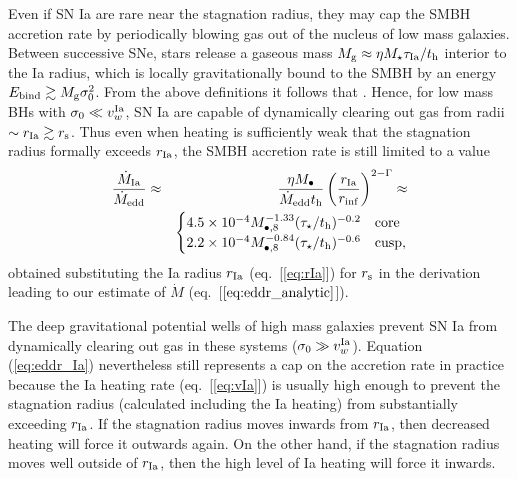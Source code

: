 \documentclass[usenatbib,fleqn]{mn2e}
\newcommand{\Mbheight}{M_{\bullet,8}}
\newcommand{\rIa}{r_{\rm Ia}}
\begin{document}
Even if SN Ia are rare near the stagnation radius, they may cap the SMBH accretion rate by periodically blowing gas out of the nucleus of low mass galaxies.  Between successive SNe, stars release a gaseous mass $M_{\rm g} \approx \eta M_{\star}\tau_{\rm Ia}/t_{\rm h}$
interior to the Ia radius, which is locally gravitationally bound to
the SMBH by an energy $E_{\rm bind} \gtrsim M_{\rm
  g}\sigma_0^{2}$.  From the above definitions it follows that
 \be
{} \lesssim {}.
\label{eq:blowout}
\ee
Hence, for low mass BHs with $\sigma_0 \ll v^{\rm Ia}_{w}$, SN Ia are capable of dynamically clearing out gas from radii $\sim r_{\rm Ia} \gtrsim r_{\rm s}$.  Thus even when heating is sufficiently weak that the stagnation radius formally exceeds $r_{\rm Ia}$, the SMBH accretion rate is still limited to a value
\begin{eqnarray}
\frac{\dot{M}_{\rm Ia}}{\dot{M}_{\rm edd}} &\approx& \frac{\eta M_{\bullet}}{\dot{M}_{\rm edd} t_{\rm h}}\left(\frac{r_{\rm Ia}}{r_{\rm inf}}\right)^{2-\Gamma} \approx \nonumber \\
 && \begin{cases}
    4.5 \times 10^{-4} M_{\bullet,8}^{-1.33}(\tau_{\star}/t_{\rm h})^{-0.2}
   & \text{core} \\
    2.2 \times 10^{-4} \Mbheight^{-0.84}(\tau_{\star}/t_{\rm h})^{-0.6}   & \text{cusp},
  \end{cases}
  \label{eq:eddr_Ia}
\end{eqnarray}
obtained substituting the Ia radius $r_{\rm Ia}$ (eq.~[\ref{eq:rIa}])
for $r_{\rm s}$ in the derivation leading to our estimate of $\dot{M}$
(eq.~[$\ref{eq:eddr_analytic}$]).  

The deep gravitational potential wells of high mass galaxies prevent SN Ia from dynamically clearing out gas in these systems ($\sigma_0 \gg  v^{\rm Ia}_{w}$).  Equation (\ref{eq:eddr_Ia}) nevertheless still represents a cap on the accretion rate in practice because the Ia heating rate (eq.~[\ref{eq:vIa}])
is usually high enough to prevent the stagnation radius (calculated including the Ia heating) from substantially exceeding $r_{\rm Ia}$. If the stagnation radius moves inwards from $\rIa$, then decreased heating will force it outwards again.  On the other hand, if the stagnation radius moves well outside of $\rIa$, then the high level of Ia heating will force it inwards. 
\end{document}
